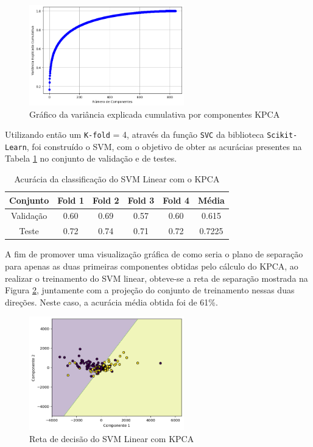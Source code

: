 \documentclass[]{abntex2}
\begin{document}
\begin{figure}
    \centering 
    \includegraphics[width=0.6\textwidth]{imgs/ex1/vari_kpca.png}
    \caption{Gráfico da variância explicada cumulativa por componentes KPCA}
    \label{fig:vari_kpca} %
\end{figure}

Utilizando então um \texttt{K-fold} = 4, através da função \texttt{SVC} da biblioteca \texttt{Scikit-Learn}, foi construído o SVM, com o objetivo de obter as acurácias presentes na Tabela \ref{tab:kpca_svm} no conjunto de validação e de testes.

\begin{table}[H]
    \centering
    \begin{tabular}{|c|c|c|c|c|c|}
    \hline
    \rowcolor[HTML]{C0C0C0} 
    Conjunto                          & Fold 1 & Fold 2 & Fold 3 & Fold 4 & Média  \\ \hline
    \cellcolor[HTML]{C0C0C0}Validação & 0.60   & 0.69   & 0.57   & 0.60   & 0.615  \\ \hline
    \cellcolor[HTML]{C0C0C0}Teste     & 0.72   & 0.74   & 0.71   & 0.72   & 0.7225 \\ \hline
    \end{tabular}
    \caption{Acurácia da classificação do SVM Linear com o KPCA}
    \label{tab:kpca_svm}
\end{table}

A fim de promover uma visualização gráfica de como seria o plano de separação para apenas as duas primeiras componentes obtidas pelo cálculo do KPCA, ao realizar o treinamento do SVM linear, obteve-se a reta de separação mostrada na Figura \ref{fig:kpca_reta}, juntamente com a projeção do conjunto de treinamento nessas duas direções. Neste caso, a acurácia média obtida foi de 61\%.

\begin{figure}
    \centering 
    \includegraphics[width=0.6\textwidth]{imgs/ex1/kpca_reta.png}
    \caption{Reta de decisão do SVM Linear com KPCA}
    \label{fig:kpca_reta} %
\end{figure}
\end{document}
